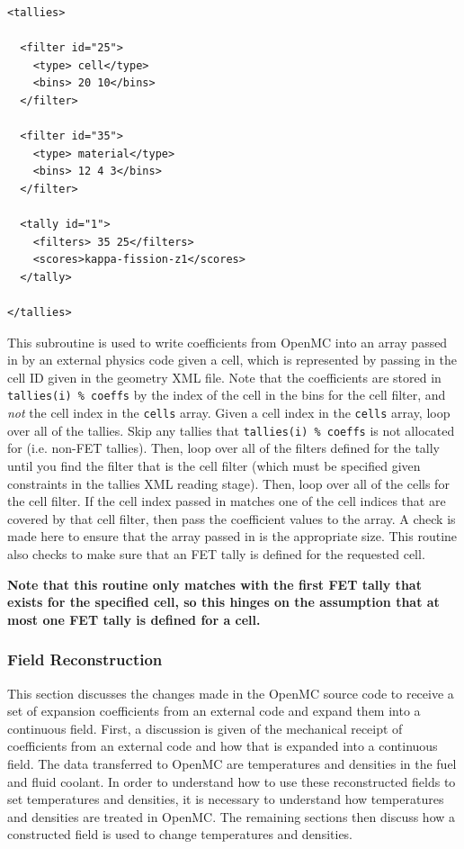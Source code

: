 \documentclass[10pt]{article}
\newcounter{subsubsubsection}[subsubsection]
\numberwithin{equation}{section} %
\begin{document}
\begin{lstlisting}
<tallies>

  <filter id="25">
    <type> cell</type>
    <bins> 20 10</bins>
  </filter>

  <filter id="35">
    <type> material</type>
    <bins> 12 4 3</bins>
  </filter>

  <tally id="1">
    <filters> 35 25</filters>
    <scores>kappa-fission-z1</scores>
  </tally>

</tallies>
\end{lstlisting}

This subroutine is used to write coefficients from OpenMC into an array passed in by an external physics code given a cell, which is represented by passing in the cell ID given in the geometry XML file. Note that the coefficients are stored in {\tt tallies(i) \% coeffs} by the index of the cell in the bins for the cell filter, and {\it not} the cell index in the {\tt cells} array. Given a cell index in the {\tt cells} array, loop over all of the tallies. Skip any tallies that {\tt tallies(i) \% coeffs} is not allocated for (i.e. non-FET tallies). Then, loop over all of the filters defined for the tally until you find the filter that is the cell filter (which must be specified given constraints in the tallies XML reading stage). Then, loop over all of the cells for the cell filter. If the cell index passed in matches one of the cell indices that are covered by that cell filter, then pass the coefficient values to the array. A check is made here to ensure that the array passed in is the appropriate size. This routine also checks to make sure that an FET tally is defined for the requested cell.

{\bf Note that this routine only matches with the first FET tally that exists for the specified cell, so this hinges on the assumption that at most one FET tally is defined for a cell.}

\subsubsection{Field Reconstruction}
This section discusses the changes made in the OpenMC source code to receive a set of expansion coefficients from an external code and expand them into a continuous field. First, a discussion is given of the mechanical receipt of coefficients from an external code and how that is expanded into a continuous field. The data transferred to OpenMC are temperatures and densities in the fuel and fluid coolant. In order to understand how to use these reconstructed fields to set temperatures and densities, it is necessary to understand how temperatures and densities are treated in OpenMC. The remaining sections then discuss how a constructed field is used to change temperatures and densities.
\end{document}
